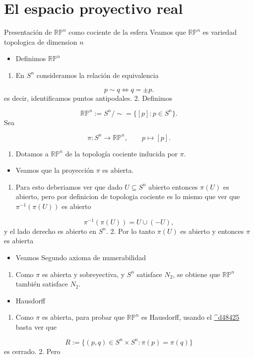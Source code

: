 \section{El espacio proyectivo real}
\begin{bookdefinition}{Presentación de $\mathbb{RP}^n$ como cociente de la esfera}
Veamos que $\mathbb{R}\mathbb{P}^{n}$ es variedad topologica de dimension $n$

\end{bookdefinition}
\begin{bookproof}{}
\begin{itemize}
\item Definimos $\mathbb{R}\mathbb{P}^{n}$
\end{itemize}
\begin{enumerate}
\item En $S^n$ consideramos la relación de equivalencia
\end{enumerate}
\[
p\sim q\iff q=\pm p.
\]
es decir, identificamos puntos antipodales. 2. Definimos

\[
\mathbb{RP}^n:=S^n/{\sim} = \{[p]:p\in S^n\}.
\]
Sea

\[
\pi:S^n\longrightarrow \mathbb{RP}^n, \qquad p\longmapsto [p].
\]
\begin{enumerate}[start=3]
\item Dotamos a $\mathbb{RP}^n$ de la topología cociente inducida por $\pi$.
\end{enumerate}
\begin{itemize}
\item Veamos que la proyección $\pi$ es abierta.
\end{itemize}
\begin{enumerate}
\item Para esto deberiamos ver que dado $U\subseteq S^{n}$ abierto entonces $\pi(U)$ es abierto, pero por definicion de topologia cociente es lo mismo que ver que $\pi ^{-1}(\pi(U))$ es abierto
\end{enumerate}
\[
\pi^{-1}(\pi(U))=U\cup (-U),
\]
y el lado derecho es abierto en $S^n$. 2. Por lo tanto $\pi(U)$ es abierto y entonces $\pi$ es abierta

\begin{itemize}
\item Veamos Segundo axioma de numerabilidad
\end{itemize}
\begin{enumerate}
\item Como $\pi$ es abierta y sobreyectiva, y $S^n$ satisface $N_2$, se obtiene que $\mathbb{RP}^n$ también satisface $N_2$.
\end{enumerate}
\begin{itemize}
\item Hausdorff
\end{itemize}
\begin{enumerate}
\item Como $\pi$ es abierta, para probar que $\mathbb{RP}^n$ es Hausdorff, usando el \hyperref[blk:d48425]{\textasciicircum{}d48425} basta ver que
\end{enumerate}
\[
R:=\{(p,q)\in S^n\times S^n:\pi(p)=\pi(q)\}
\]
es cerrado. 2. Pero


\end{bookproof}
